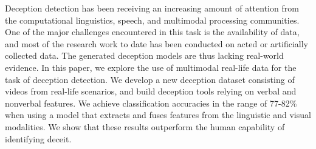 Deception detection has been receiving an increasing amount of attention from the computational linguistics, speech, and multimodal processing communities. One of the major challenges encountered in this task is the availability of data, and most of the research work to date has been conducted on acted or artificially collected data. The generated deception models are thus lacking real-world evidence. In this paper, we explore the use of multimodal real-life data for the task of deception detection. We develop a new deception dataset consisting of videos from real-life scenarios, and build deception tools relying on verbal and nonverbal features. We achieve classification accuracies in the range of 77-82\% when using a model that extracts and fuses features from the linguistic and visual modalities. We  show that  these  results  outperform the  human capability of  identifying deceit.
